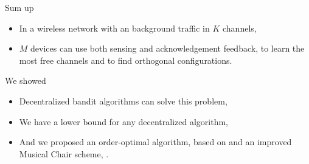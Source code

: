 \documentclass[12pt,english,ignorenonframetext,aspectratio=169,]{beamer}
\providecommand{\tightlist}{%
  \setlength{\itemsep}{0pt}\setlength{\parskip}{0pt}}
\begin{document}
\begin{frame}{Sum up}








\begin{itemize}\tightlist
\item
  In a wireless network with an \iid{} background traffic in \(K\)
  channels,
\item
  \(M\) devices can use both sensing and acknowledgement feedback, to
  learn the most free channels and to find orthogonal configurations.
\end{itemize}

\begin{block}{We showed}

\begin{itemize}\tightlist
\item
  Decentralized bandit algorithms can solve this problem,
\item
  We have a lower bound for any decentralized algorithm,
\item
  And we proposed an order-optimal algorithm, based on \klUCB{} and an
  improved Musical Chair scheme, \MCTopM.
\end{itemize}

\end{block}

\end{frame}
\end{document}
